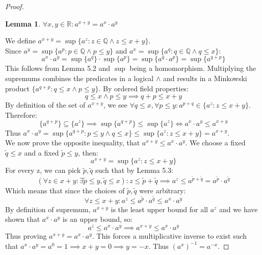 \documentclass{article}
\newtheorem{lem}{Lemma}[section]
\begin{document}
\begin{proof}
\medskip
\begin{lem}
  $\forall x, y \in \mathbb{R}: a^{x+y} = a^x \cdot a^y$  
\end{lem}
We define $a^{x+y} = \sup\{a^z: z \in \mathbb{Q} \land z \leqslant x + y\}$.\\

Since $a^y = \sup\{a^p: p \in \mathbb{Q} \land p \leqslant y\}$ and $a^x = \sup\{a^q: q \in \mathbb{Q} \land q \leqslant x\}$:
\begin{equation*}
    a^x \cdot a^y = \sup\{a^q\} \cdot \sup\{a^p\} = \sup\{a^q \cdot a^p\} = \sup\{a^{q+p}\}
\end{equation*}
This follows from Lemma 5.2 and $\sup$ being a homomorphism. Multiplying the supremums combines the predicates in a logical $\land$ and results in a Minkowski product $\{a^{q+p}: q \leqslant x \land p \leqslant y\}$. By ordered field properties:
\begin{equation*}
    q \leqslant x \land p \leqslant y \implies q + p \leqslant x + y
\end{equation*}
By definition of the set of $a^{x+y}$, we see $\forall q \leqslant x, \forall p \leqslant y: a^{p+q} \in \{a^z: z \leqslant x + y\}$. Therefore:
\begin{equation*}
    \{a^{q+p}\} \subseteq \{a^z\} \implies \sup\{a^{q+p}\} \leqslant \sup\{a^z\} \iff a^x \cdot a^y \leqslant a^{x+y}
\end{equation*}
Thus $a^x \cdot a^y = \sup\{a^{q+p}: p \leqslant y \land q \leqslant x\} \leqslant \sup\{a^{z}: z \leqslant x + y\}  = a^{x+y}$. \\

We now prove the opposite inequality, that $a^{x+y} \leqslant a^x \cdot a^y$. We choose a fixed $\tilde{q} \leqslant x$ and a fixed $\tilde{p} \leqslant y$, then:
\begin{equation*}
    a^{x+y} = \sup\{a^{z}: z \leqslant x + y\}
\end{equation*}
For every z, we can pick $\tilde{p}, \tilde{q}$ such that by Lemma 5.3:
\begin{equation*}
    (\forall z \in x+y: \exists \tilde{p} \leqslant y, \tilde{q} \leqslant x): z \leqslant \tilde{p} + \tilde{q} \implies a^z \leqslant a^{\tilde{p} + \tilde{q}} = a^{\tilde{p}} \cdot a^{\tilde{q}}
\end{equation*}
Which means that since the choices of $\tilde{p}, \tilde{q}$ were arbitrary:
\begin{equation*}
    \forall z \leqslant x + y: a^z \leqslant a^{\tilde{p}} \cdot a^{\tilde{q}} \leqslant a^x \cdot a^y
\end{equation*}
By definition of supremum, $a^{x+y}$ is the least upper bound for all $a^z$ and we have shown that $a^x \cdot a^y$ is an upper bound, so:
\begin{equation*}
    a^z \leqslant a^x \cdot a^y \implies a^{x+y} \leqslant a^x \cdot a^y
\end{equation*}
Thus proving $a^{x+y} = a^x \cdot a^y$. This forces a multiplicative inverse to exist such that $a^x \cdot a^y = a ^ 0 = 1 \implies x + y = 0 \implies y = -x$. Thus $(a^x)^{-1} = a^{-x}$.
\end{proof}
\end{document}

